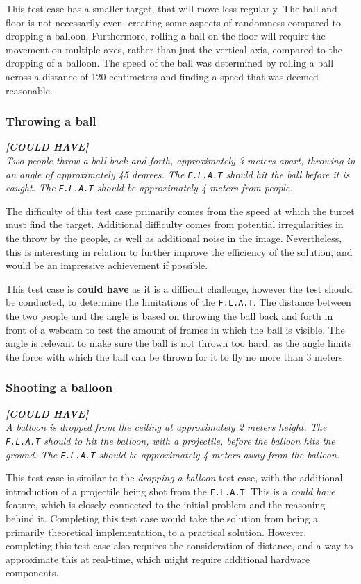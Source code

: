 This test case has a smaller target, that will move less regularly.
The ball and floor is not necessarily even, creating some aspects of randomness compared to dropping a balloon.
Furthermore, rolling a ball on the floor will require the movement on multiple axes, rather than just the vertical axis, compared to the dropping of a balloon.
The speed of the ball was determined by rolling a ball across a distance of 120 centimeters and finding a speed that was deemed reasonable.

\subsubsection{Throwing a ball}
\textit{\textbf{[COULD HAVE]}}\\
\textit{Two people throw a ball back and forth, approximately 3 meters apart, throwing in an angle of approximately 45 degrees.
The \texttt{F.L.A.T} should hit the ball before it is caught.
The \texttt{F.L.A.T} should be approximately 4 meters from people.}

The difficulty of this test case primarily comes from the speed at which the turret must find the target.
Additional difficulty comes from potential irregularities in the throw by the people, as well as additional noise in the image.
Nevertheless, this is interesting in relation to further improve the efficiency of the solution, and would be an impressive achievement if possible.

This test case is \textbf{could have} as it is a difficult challenge, however the test should be conducted, to determine the limitations of the \texttt{F.L.A.T}.
The distance between the two people and the angle is based on throwing the ball back and forth in front of a webcam to test the amount of frames in which the ball is visible.
The angle is relevant to make sure the ball is not thrown too hard, as the angle limits the force with which the ball can be thrown for it to fly no more than 3 meters.

\subsubsection{Shooting a balloon}
\textit{\textbf{[COULD HAVE]}}\\
\textit{A balloon is dropped from the ceiling at approximately 2 meters height.
The \texttt{F.L.A.T} should to hit the balloon, with a projectile, before the balloon hits the ground.
The \texttt{F.L.A.T} should be approximately 4 meters away from the balloon.}

This test case is similar to the \textit{dropping a balloon} test case, with the additional introduction of a projectile being shot from the \texttt{F.L.A.T}.
This is a \textit{could have} feature, which is closely connected to the initial problem and the reasoning behind it.
Completing this test case would take the solution from being a primarily theoretical implementation, to a practical solution.
However, completing this test case also requires the consideration of distance, and a way to approximate this at real-time, which might require additional hardware components.
